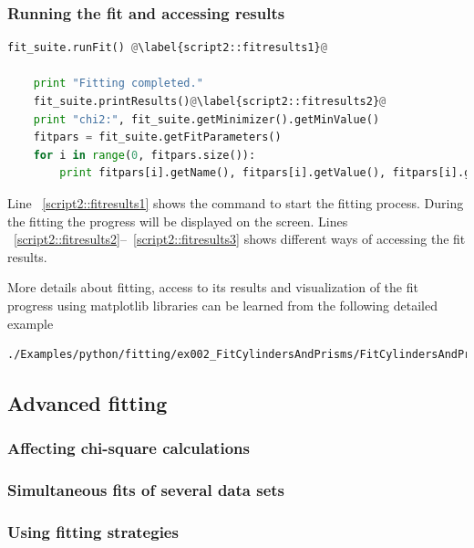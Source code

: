 \subsubsection*{Running the fit and accessing results}
\begin{lstlisting}[language=python, style=eclipseboxed, firstnumber=66]
    fit_suite.runFit() @\label{script2::fitresults1}@

    print "Fitting completed."
    fit_suite.printResults()@\label{script2::fitresults2}@
    print "chi2:", fit_suite.getMinimizer().getMinValue()
    fitpars = fit_suite.getFitParameters()
    for i in range(0, fitpars.size()):
        print fitpars[i].getName(), fitpars[i].getValue(), fitpars[i].getError() @\label{script2::fitresults3}@
\end{lstlisting}
Line ~\ref{script2::fitresults1} shows the command to start the fitting process.
During the fitting the progress will be displayed on the screen.
Lines ~\ref{script2::fitresults2}--~\ref{script2::fitresults3} shows different ways of
accessing the fit results.


More details about fitting, access to its results and visualization of
the fit progress using matplotlib libraries can be learned from the
following detailed example
\begin{lstlisting}[language=shell, style=commandline]
./Examples/python/fitting/ex002_FitCylindersAndPrisms/FitCylindersAndPrisms_detailed.py
\end{lstlisting}


\subsection{Advanced fitting} \label{sec:FittingAdvanced}

\subsubsection{Affecting chi-square calculations}
\MissingSection
\subsubsection{Simultaneous fits of several data sets}
\MissingSection
\subsubsection{Using fitting strategies}
\MissingSection
